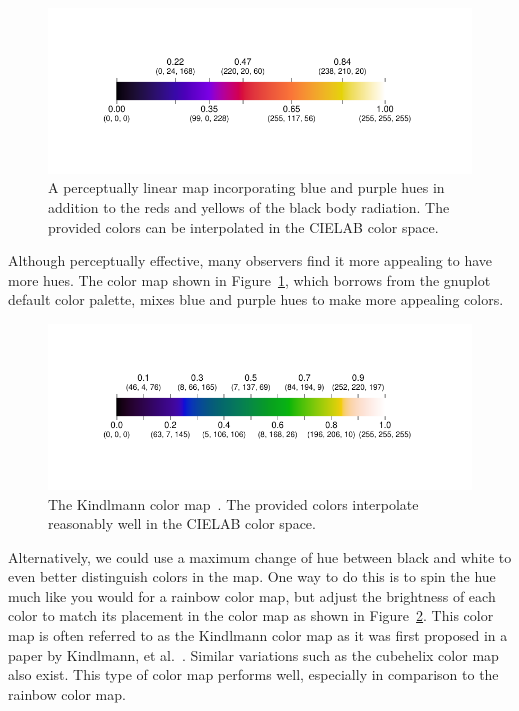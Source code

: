 \documentclass[letterpaper,twocolumn,fleqn]{article}
\newcommand*{\lcite}[1]{~\cite{#1}}
\newcommand*{\scite}[1]{~\cite{#1}}
\newcommand{\etal}{et al.\xspace}
\begin{document}
\begin{figure}[htb]
  \centering
  \includegraphics[width=\linewidth,trim=0.69in 0.62in 0.76in 0.62in]
                  {ipython/BlackBodyExtendedMap}
  \caption{A perceptually linear map incorporating blue and purple hues in
    addition to the reds and yellows of the black body radiation. The
    provided colors can be interpolated in the CIELAB color space.}
  \label{fig:BlackBodyExtendedColorBar}
\end{figure}

Although perceptually effective, many observers find it more appealing to
have more hues. The color map shown in
Figure~\ref{fig:BlackBodyExtendedColorBar}, which borrows from the gnuplot
default color palette, mixes blue and purple hues to make more appealing
colors.

\begin{figure}[htb]
  \centering
  \includegraphics[width=\linewidth,trim=0.69in 0.62in 0.76in 0.62in]
                  {ipython/KindlmannMap}
  \caption{The Kindlmann color map\lcite{Kindlmann2002}. The provided
    colors interpolate reasonably well in the CIELAB color space.}
  \label{fig:KindlmannColorBar}
\end{figure}

Alternatively, we could use a maximum change of hue between black and white
to even better distinguish colors in the map. One way to do this is to spin
the hue much like you would for a rainbow color map, but adjust the
brightness of each color to match its placement in the color map as shown
in Figure~\ref{fig:KindlmannColorBar}. This color map is often referred to
as the Kindlmann color map as it was first proposed in a paper by
Kindlmann, \etal\scite{Kindlmann2002}. Similar variations such as the
cubehelix color map\lcite{Green2011} also exist. This type of color map
performs well, especially in comparison to the rainbow color map.
\end{document}
